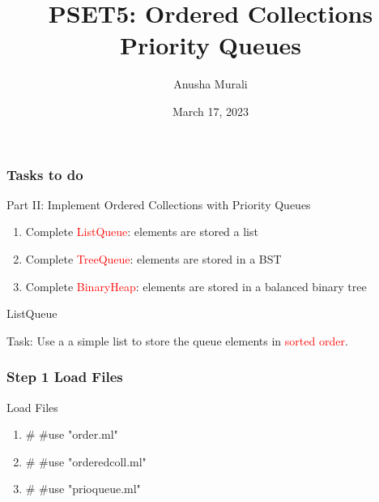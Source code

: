 \documentclass{beamer}
\title{PSET5: Ordered Collections \\ Priority Queues}
\date{March 17, 2023}
\author{Anusha Murali}
\begin{document}

\begin{frame}[fragile]
\titlepage

\end{frame}


\begin{frame}[fragile]
\frametitle{Tasks to do}

\begin{block}{Part II: Implement Ordered Collections with Priority Queues}
\begin{enumerate}
\item Complete \textcolor{red}{ListQueue}: elements are stored a list
\item Complete \textcolor{red}{TreeQueue}: elements are stored in a BST
\item Complete \textcolor{red}{BinaryHeap}: elements are stored in a balanced binary tree
\end{enumerate}
\end{block}
\end{frame}


\begin{frame}[fragile]

\vspace*{0.5in}

\centerline{\huge ListQueue}

\vspace*{0.2in}
\begin{center}
Task: Use a a simple list to store the queue elements in \textcolor{red}{sorted order}.
\end{center}

\end{frame}





\begin{frame}[fragile]
\frametitle{Step 1 Load Files}

\begin{block}{Load Files}
\begin{enumerate}
\item \# \#use "order.ml"
\item \# \#use "orderedcoll.ml"
\item \# \#use "prioqueue.ml"
\end{enumerate}
\end{block}
\end{frame}
\end{document}
